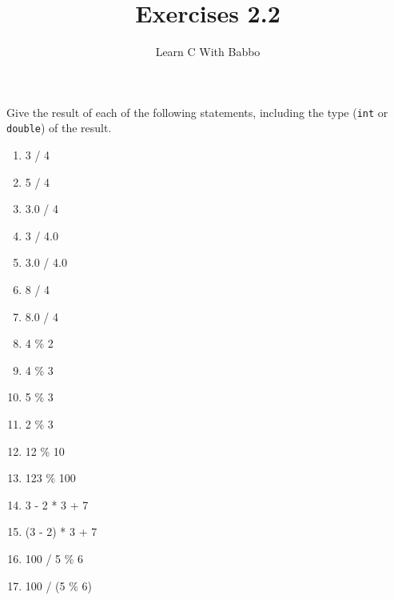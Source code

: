 \documentclass{article}
\begin{document}
\title{Exercises 2.2}
\author{Learn C With Babbo}
\date{}
\maketitle
Give the result of each of the following statements, including the type (\verb|int| or \verb|double|)
of the result.
\begin{enumerate}
\item 3 / 4
\item 5 / 4
\item 3.0 / 4
\item 3 / 4.0
\item 3.0 / 4.0
\item 8 / 4
\item 8.0 / 4
\item 4 \% 2
\item 4 \% 3
\item 5 \% 3
\item 2 \% 3
\item 12 \% 10
\item 123 \% 100
\item 3 - 2 * 3 + 7
\item (3 - 2) * 3 + 7
\item 100 / 5 \% 6
\item 100 / (5 \% 6)
\end{enumerate}
\end{document}
